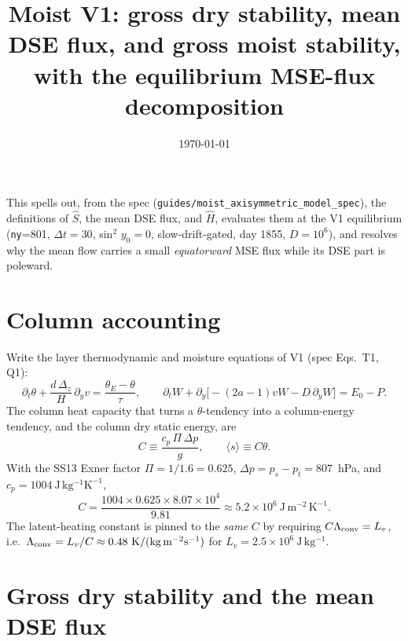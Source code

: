 \documentclass[11pt]{article}
\title{Moist V1: gross dry stability, mean DSE flux, and gross moist stability,\\
with the equilibrium MSE-flux decomposition}
\date{\today}
\newcommand{\py}{\partial_y}
\newcommand{\Shat}{\hat S}
\newcommand{\Hhat}{\hat H}
\newcommand{\col}[1]{\langle #1\rangle}
\begin{document}
\maketitle

This spells out, from the spec (\texttt{guides/moist\_axisymmetric\_model\_spec}),
the definitions of $\Shat$, the mean DSE flux, and $\Hhat$, evaluates them at the
V1 equilibrium (\texttt{ny}=801, $\Delta t{=}30$, sin$^2$ $y_0{=}0$, slow-drift-gated,
day 1855, $D{=}10^6$), and resolves why the mean flow carries a small
\emph{equatorward} MSE flux while its DSE part is poleward.

\section{Column accounting}

Write the layer thermodynamic and moisture equations of V1 (spec Eqs.~T1, Q1):
\begin{equation}
\partial_t\theta + \frac{d\,\Delta_z}{H}\,\py v = \frac{\theta_E-\theta}{\tau},
\qquad
\partial_t W + \py\!\big[-(2a{-}1)vW - D\,\py W\big] = E_0 - P .
\end{equation}
The column heat capacity that turns a $\theta$-tendency into a column-energy
tendency, and the column dry static energy, are
\begin{equation}
C \equiv \frac{c_p\,\Pi\,\Delta p}{g},
\qquad \col{s}\equiv C\theta .
\end{equation}
With the SS13 Exner factor $\Pi=1/1.6=0.625$, $\Delta p = p_s-p_t = 807$~hPa, and
$c_p=1004~\mathrm{J\,kg^{-1}K^{-1}}$,
\begin{equation}
C = \frac{1004\times 0.625\times 8.07\times10^{4}}{9.81}
  \approx 5.2\times10^{6}~\mathrm{J\,m^{-2}\,K^{-1}} .
\end{equation}
The latent-heating constant is pinned to the \emph{same} $C$ by requiring
$C\Lambda_{\rm conv}=L_v$, i.e.\ $\Lambda_{\rm conv}=L_v/C\approx0.48~\mathrm{K/(kg\,m^{-2}s^{-1})}$
for $L_v=2.5\times10^{6}~\mathrm{J\,kg^{-1}}$.

\section{Gross dry stability and the mean DSE flux}
\end{document}
